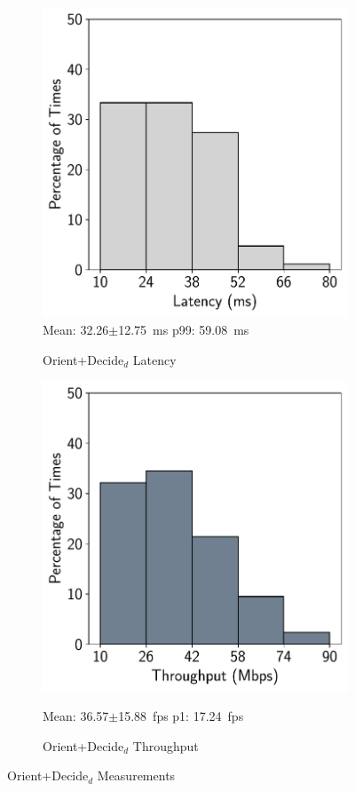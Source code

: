 \begin{figure}[htbp]
    \centering
    \begin{subfigure}[t]{0.45\textwidth}
    \centering
    \includegraphics[width = .8\textwidth]{figs/stage-1-latency-pdraw.pdf}\\
    \small{Mean: 32.26$\pm$12.75~ms\; p99: 59.08~ms}\\
    \caption{Orient+Decide$_{d}$ Latency}
    \label{fig:stage1_latency}
\end{subfigure}
\begin{subfigure}[t]{0.45\textwidth}
    \centerline{\includegraphics[width = .8\textwidth]{figs/stage-1-throughput-pdraw.pdf}}
    \centering
    \small{Mean: 36.57$\pm$15.88~fps\; p1: 17.24~fps}\\
    \caption{Orient+Decide$_{d}$ Throughput}
    \label{fig:stage1_throughput}
\end{subfigure}
    \caption{Orient+Decide$_{d}$ Measurements}
    \label{fig:stage1_measurements}
\end{figure}

